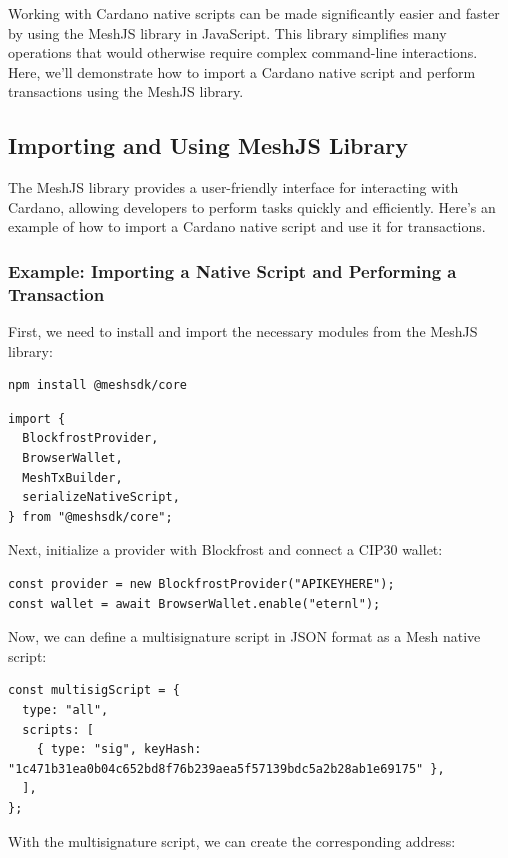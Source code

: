 Working with Cardano native scripts can be made significantly easier and faster by using the MeshJS library in JavaScript. This library simplifies many operations that would otherwise require complex command-line interactions. Here, we'll demonstrate how to import a Cardano native script and perform transactions using the MeshJS library.

\subsection{Importing and Using MeshJS Library}

The MeshJS library provides a user-friendly interface for interacting with Cardano, allowing developers to perform tasks quickly and efficiently. Here’s an example of how to import a Cardano native script and use it for transactions.

\subsubsection{Example: Importing a Native Script and Performing a Transaction}

First, we need to install and import the necessary modules from the MeshJS library:

\begin{lstlisting}
npm install @meshsdk/core
\end{lstlisting}

\begin{lstlisting}
import {
  BlockfrostProvider,
  BrowserWallet,
  MeshTxBuilder,
  serializeNativeScript,
} from "@meshsdk/core";
\end{lstlisting}

Next, initialize a provider with Blockfrost and connect a CIP30 wallet:

\begin{lstlisting}
const provider = new BlockfrostProvider("APIKEYHERE");
const wallet = await BrowserWallet.enable("eternl");
\end{lstlisting}

Now, we can define a multisignature script in JSON format as a Mesh native script:

\begin{lstlisting}
const multisigScript = {
  type: "all",
  scripts: [
    { type: "sig", keyHash: "1c471b31ea0b04c652bd8f76b239aea5f57139bdc5a2b28ab1e69175" },
  ],
};
\end{lstlisting}

With the multisignature script, we can create the corresponding address:

